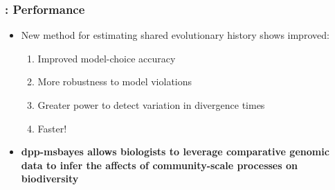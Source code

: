 \begin{frame}
    \frametitle{\dppmsbayes: Performance}
    \begin{itemize}
        \item<1-> New method for estimating shared evolutionary history shows
            improved:
            \begin{enumerate}
                \item<1-> Improved model-choice accuracy 
                \item<1-> More robustness to model violations
                \item<1-> Greater power to detect variation in divergence times
                \item<1-> Faster!
            \end{enumerate}
        \item<2-> \textbf{dpp-msbayes allows biologists to leverage comparative
                genomic data to infer the affects of community-scale processes
                on biodiversity}
    \end{itemize}

\end{frame}
